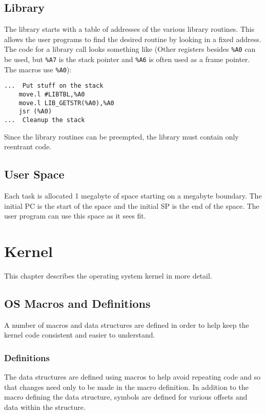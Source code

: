 \documentclass[10pt]{book}
\begin{document}
\section{Library}
The library starts with a table of addresses of the various library routines.  This allows the user programs to find the desired routine by looking in a fixed address.  The code for a library call looks something like (Other registers besides \verb|%A0| can be used, but \verb|%A7| is the stack pointer and \verb|%A6| is often used as a frame pointer.  The macros use \verb|%A0|):
\begin{lstlisting}
...  Put stuff on the stack
    move.l #LIBTBL,%A0
    move.l LIB_GETSTR(%A0),%A0
    jsr (%A0)
...  Cleanup the stack
\end{lstlisting}

Since the library routines can be preempted, the library must contain only reentrant code.

\section{User Space}
Each task is allocated 1 megabyte of space starting on a megabyte boundary.  The initial PC is the start of the space and the initial SP is the end of the space.  The user program can use this space as it sees fit.

\chapter{Kernel}
This chapter describes the operating system kernel in more detail.
\section{OS Macros and Definitions}
A number of macros and data structures are defined in order to help keep the kernel code consistent and easier to understand.

\subsection{Definitions}
The data structures are defined using macros to help avoid repeating code and so that changes need only to be made in the macro definition.  In addition to the macro defining the data structure, symbols are defined for various offsets and data within the structure.
\end{document}

